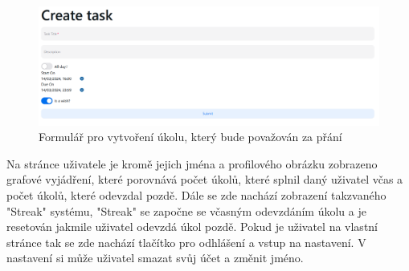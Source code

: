 \begin{figure}[hbt!]
    \centering
    \includegraphics[width=1\linewidth]{img/taskCreate.png}
    \caption{Formulář pro vytvoření úkolu, který bude považován za přání}
\end{figure}
\newpage
Na stránce uživatele je kromě jejich jména a profilového obrázku zobrazeno grafové vyjádření, které porovnává počet úkolů, které splnil daný uživatel včas a počet úkolů, které odevzdal pozdě. Dále se zde nachází zobrazení takzvaného "Streak" systému, "Streak" se započne se včasným odevzdáním úkolu a je resetován jakmile uživatel odevzdá úkol pozdě. Pokud je uživatel na vlastní stránce tak se zde nachází tlačítko pro odhlášení a vstup na nastavení. V nastavení si může uživatel smazat svůj účet a změnit jméno.

